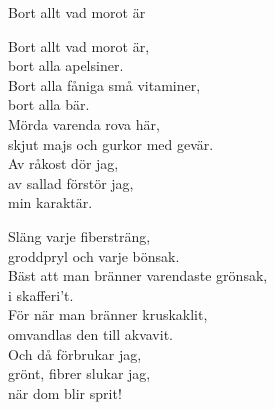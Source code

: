 \begin{song}{Bort allt vad morot är}
	
	
	
	Bort allt vad morot är,\\
	bort alla apelsiner.\\
	Bort alla fåniga små vitaminer,\\
	bort alla bär.\\
	Mörda varenda rova här,\\
	skjut majs och gurkor med gevär.\\
	Av råkost dör jag,\\
	av sallad förstör jag,\\
	min karaktär.
	
	Släng varje fibersträng,\\
	groddpryl och varje bönsak.\\
	Bäst att man bränner varendaste grönsak,\\
	i skafferi’t.\\
	För när man bränner kruskaklit,\\
	omvandlas den till akvavit.\\
	Och då förbrukar jag,\\
	grönt, fibrer slukar jag,\\
	när dom blir sprit!
	
\end{song}
